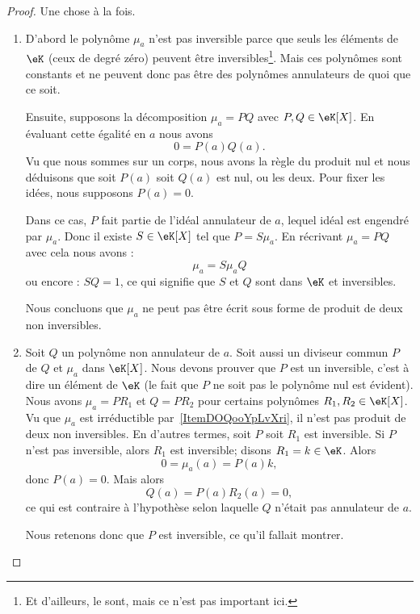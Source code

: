 \begin{proof}
    Une chose à la fois.
    \begin{enumerate}
        \item
            D'abord le polynôme \( \mu_a\) n'est pas inversible parce que seuls les éléments de \( \eK\) (ceux de degré zéro) peuvent être inversibles\footnote{Et d'ailleurs, le sont, mais ce n'est pas important ici.}. Mais ces polynômes sont constants et ne peuvent donc pas être des polynômes annulateurs de quoi que ce soit.

            Ensuite, supposons la décomposition \( \mu_a=PQ\) avec \( P,Q\in \eK[X]\). En évaluant cette égalité en \( a\) nous avons
            \begin{equation}
                0=P(a)Q(a).
            \end{equation}
            Vu que nous sommes sur un corps, nous avons la règle du produit nul et nous déduisons que soit \( P(a)\) soit \( Q(a)\) est nul, ou les deux. Pour fixer les idées, nous supposons \( P(a)=0\).

            Dans ce cas, \( P\) fait partie de l'idéal annulateur de \( a\), lequel idéal est engendré par \( \mu_a\). Donc il existe \( S\in \eK[X]\) tel que \( P=S\mu_a\). En récrivant \( \mu_a=PQ\) avec cela nous avons :
            \begin{equation}
                \mu_a=S\mu_aQ
            \end{equation}
            ou encore : \( SQ=1\), ce qui signifie que \( S\) et \( Q\) sont dans \( \eK\) et inversibles.

            Nous concluons que \( \mu_a\) ne peut pas être écrit sous forme de produit de deux non inversibles.
        \item
            Soit \( Q\) un polynôme non annulateur de \( a\). Soit aussi un diviseur commun \( P\) de \( Q\) et \( \mu_a\) dans \( \eK[X]\). Nous devons prouver que \( P\) est un inversible, c'est à dire un élément de \( \eK\) (le fait que \( P\) ne soit pas le polynôme nul est évident).
            Nous avons \( \mu_a=PR_1\) et \( Q=PR_2\) pour certains polynômes \( R_1,R_2\in \eK[X]\). Vu que \( \mu_a\) est irréductible par~\ref{ItemDOQooYpLvXri}, il n'est pas produit de deux non inversibles. En d'autres termes, soit \( P\) soit \( R_1\) est inversible. Si \( P \) n'est pas inversible, alors \( R_1\) est inversible; disons \( R_1=k\in \eK\). Alors
            \begin{equation}
                0=\mu_a(a)=P(a)k,
            \end{equation}
            donc \( P(a)=0\). Mais alors
            \begin{equation}
                Q(a)=P(a)R_2(a)=0,
            \end{equation}
            ce qui est contraire à l'hypothèse selon laquelle \( Q\) n'était pas annulateur de \( a\).

            Nous retenons donc que \( P\) est inversible, ce qu'il fallait montrer.
    \end{enumerate}
\end{proof}

